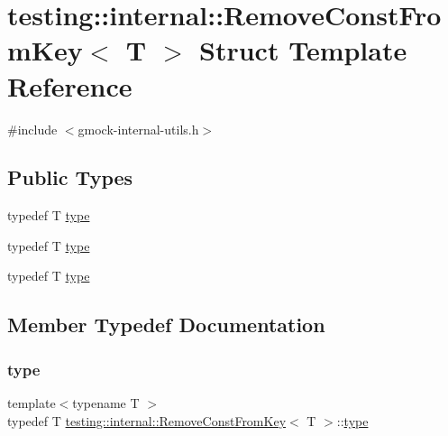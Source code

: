 \hypertarget{structtesting_1_1internal_1_1_remove_const_from_key}{}\section{testing\+::internal\+::Remove\+Const\+From\+Key$<$ T $>$ Struct Template Reference}
\label{structtesting_1_1internal_1_1_remove_const_from_key}


{\ttfamily \#include $<$gmock-\/internal-\/utils.\+h$>$}

\subsection*{Public Types}
\begin{DoxyCompactItemize}
\item 
typedef T \mbox{\hyperlink{structtesting_1_1internal_1_1_remove_const_from_key_ab657b0a0fe4ebc499d27011f73c794c1}{type}}
\item 
typedef T \mbox{\hyperlink{structtesting_1_1internal_1_1_remove_const_from_key_ab657b0a0fe4ebc499d27011f73c794c1}{type}}
\item 
typedef T \mbox{\hyperlink{structtesting_1_1internal_1_1_remove_const_from_key_ab657b0a0fe4ebc499d27011f73c794c1}{type}}
\end{DoxyCompactItemize}


\subsection{Member Typedef Documentation}
\mbox{\label{structtesting_1_1internal_1_1_remove_const_from_key_ab657b0a0fe4ebc499d27011f73c794c1}} 
\subsubsection{\texorpdfstring{type}{type}\hspace{0.1cm}{\footnotesize\ttfamily [1/3]}}
{\footnotesize\ttfamily template$<$typename T $>$ \\
typedef T \mbox{\hyperlink{structtesting_1_1internal_1_1_remove_const_from_key}{testing\+::internal\+::\+Remove\+Const\+From\+Key}}$<$ T $>$\+::\mbox{\hyperlink{structtesting_1_1internal_1_1_remove_const_from_key_ab657b0a0fe4ebc499d27011f73c794c1}{type}}}

